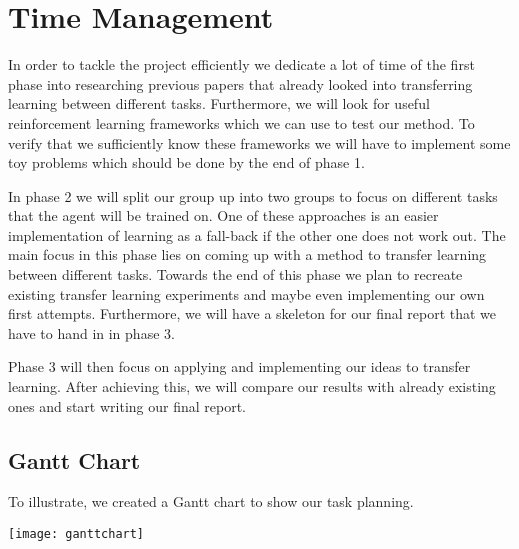 \section{Time Management}
\label{sec:time}
In order to tackle the project efficiently we dedicate a lot of time of the first phase into researching previous papers that already looked into transferring learning between different tasks. Furthermore, we will look for useful reinforcement learning frameworks which we can use to test our method. To verify that we sufficiently know these frameworks we will have to implement some toy problems which should be done by the end of phase 1. 


In phase 2 we will split our group up into two groups to focus on different tasks that the agent will be trained on. One of these approaches is an easier implementation of learning as a fall-back if the other one does not work out. The main focus in this phase lies on coming up with a method to transfer learning between different tasks. Towards the end of this phase we plan to recreate existing transfer learning experiments and maybe even implementing our own first attempts. Furthermore, we will have a skeleton for our final report that we have to hand in in phase 3.


Phase 3 will then focus on applying and implementing our ideas to transfer learning. After achieving this, we will compare our results with already existing ones and start writing our final report.

\subsection{Gantt Chart}
To illustrate, we created a Gantt chart to show our task planning.

\noindent
\texttt{[image: ganttchart]}

